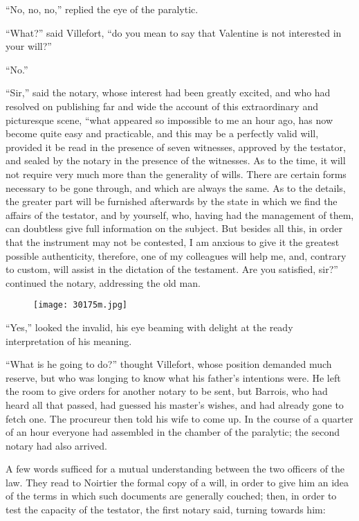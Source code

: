 “No, no, no,” replied the eye of the paralytic.

“What?” said Villefort, “do you mean to say that Valentine is not
interested in your will?”

“No.”

“Sir,” said the notary, whose interest had been greatly excited, and
who had resolved on publishing far and wide the account of this
extraordinary and picturesque scene, “what appeared so impossible to me
an hour ago, has now become quite easy and practicable, and this may be
a perfectly valid will, provided it be read in the presence of seven
witnesses, approved by the testator, and sealed by the notary in the
presence of the witnesses. As to the time, it will not require very
much more than the generality of wills. There are certain forms
necessary to be gone through, and which are always the same. As to the
details, the greater part will be furnished afterwards by the state in
which we find the affairs of the testator, and by yourself, who, having
had the management of them, can doubtless give full information on the
subject. But besides all this, in order that the instrument may not be
contested, I am anxious to give it the greatest possible authenticity,
therefore, one of my colleagues will help me, and, contrary to custom,
will assist in the dictation of the testament. Are you satisfied, sir?”
continued the notary, addressing the old man.

\begin{figure}[ht]
\texttt{[image: 30175m.jpg]}
\end{figure}

“Yes,” looked the invalid, his eye beaming with delight at the ready
interpretation of his meaning.

“What is he going to do?” thought Villefort, whose position demanded
much reserve, but who was longing to know what his father’s intentions
were. He left the room to give orders for another notary to be sent,
but Barrois, who had heard all that passed, had guessed his master’s
wishes, and had already gone to fetch one. The procureur then told his
wife to come up. In the course of a quarter of an hour everyone had
assembled in the chamber of the paralytic; the second notary had also
arrived.

A few words sufficed for a mutual understanding between the two
officers of the law. They read to Noirtier the formal copy of a will,
in order to give him an idea of the terms in which such documents are
generally couched; then, in order to test the capacity of the testator,
the first notary said, turning towards him:

